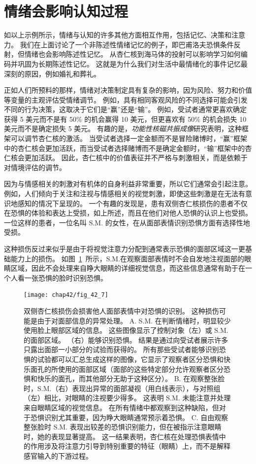 \section{情绪会影响认知过程}

如以上示例所示，情绪与认知的许多其他方面相互作用，包括记忆、决策和注意力。
我们在上面讨论了一个非陈述性情绪记忆的例子，即巴甫洛夫恐惧条件反射，但情绪也会影响陈述性记忆。
从杏仁核到海马体的投射可以影响学习如何编码并巩固为长期陈述性记忆。
这就是为什么我们对生活中最情绪化的事件记忆最深刻的原因，例如婚礼和葬礼。


正如人们所预料的那样，情绪对决策制定具有复杂的影响，因为风险、努力和价值等变量的主观评估受情绪调节。
例如，具有相同客观风险的不同选择可能会引发不同的行为决策，这取决于它们是“赢”还是“输”。
例如，受试者通常更喜欢确定获得 5 美元而不是有 50\% 的机会赢得 10 美元，但更喜欢有 50\% 的机会损失 10 美元而不是确定损失 5 美元。
有趣的是，\textit{功能性核磁共振成像}研究表明，这种框架可以调节杏仁核的激活。
当受试者选择一定金额而不是冒险赌博时，“赢”框架中的杏仁核会更加活跃，而当受试者选择赌博而不是确定金额时，“输”框架中的杏仁核会更加活跃。
因此，杏仁核中的价值表征并不严格与刺激相关，而是依赖于对情境评估的调节。


因为与情感相关的刺激对有机体的自身利益非常重要，所以它们通常会引起注意。
例如，人们倾向于关注和注视与情感相关的视觉刺激，即使这些刺激是在无法有意识地感知的情况下呈现的。
一个有趣的发现是，患有双侧杏仁核损伤的患者不仅在恐惧的体验和表达上受损，如上所述，而且在他们对他人恐惧的认识上也受损。
一位这样的患者，一位名叫 S.M. 的女性，在从面部表情识别恐惧方面有选择性地受损。

这种损伤反过来似乎是由于将视觉注意力分配到通常表示恐惧的面部区域这一更基础能力上的损伤。
如图~\ref{fig:42_7}~所示，S.M.在观察面部表情时不会自发地注视面部的眼睛区域，因此不会处理来自睁大眼睛的详细视觉信息，而这些信息通常有助于在一个人看一张恐惧的脸时识别恐惧。




\begin{figure}[htbp]
	\centering
	\texttt{[image: chap42/fig\_42\_7]}
	\caption{双侧杏仁核损伤会损害他人面部表情中对恐惧的识别。
		这种损伤可能是由于对面部信息的异常处理。
		A. S.M. 在判断情绪时，明显较少使用脸上眼部区域的信息。
		这些图像显示了控制对象（左）或 S.M. 的面部区域。
		（右）能够识别恐惧。
		结果是通过向受试者展示许多只露出面部一小部分的试验而获得的。
		所有那些受试者能够识别恐惧的试验都可以汇总生成这样的图像，它显示了观察者区分恐惧和快乐面孔的所使用的面部区域（面部的这些特定部分允许观察者区分恐惧和快乐的面孔，而其他部分无助于这种区分）。
		B. 在观察整张脸时，S.M.（右）表现出异常的面部凝视（用白线表示），与对照组（左）相比，对眼睛的注视要少得多。
		这表明 S.M. 未能注意并处理来自眼睛区域的视觉信息。
		在所有情绪中都观察到这种缺陷，但对于恐惧识别尤其重要，因为睁大眼睛通常预示着恐惧。
		C. 自由观察整张脸时 S.M. 表现出较差的恐惧识别能力，但在被指示注意眼睛时，她的表现显著提高。
		这一结果表明，杏仁核在处理恐惧表情中的作用涉及将注意力引导到特别重要的特征（眼睛）上，而不是解释感官输入的下游过程。}
	\label{fig:42_7}
\end{figure}


